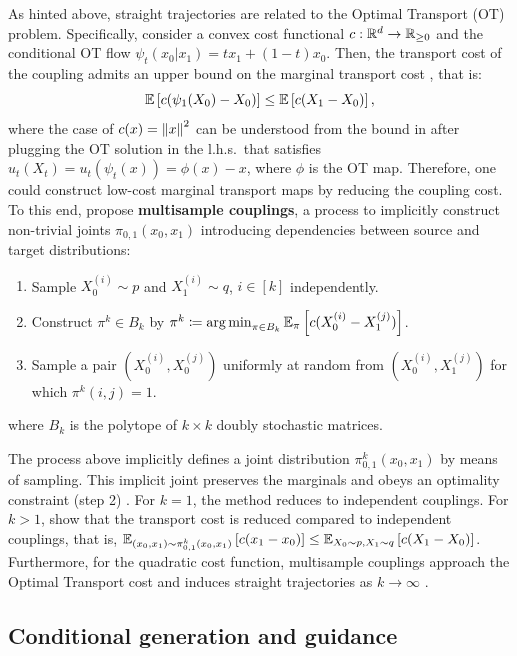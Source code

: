 \documentclass{fairmeta}
\newcommand{\highlight}[1]{{\color{metablue} \textbf{#1}}}
\renewcommand{\eqref}[1]{\labelcref{#1}}
\numberwithin{equation}{section}
\begin{document}
As hinted above, straight trajectories are related to the Optimal Transport (OT) problem.
Specifically, consider a convex cost functional $c:\mathbb R^d\rightarrow \mathbb R_{\geq0}$ and the conditional OT flow $\psi_t(x_0|x_1)=t x_1 + (1-t)x_0$.
Then, the transport cost of the coupling admits an upper bound on the marginal transport cost \citep{liu2022flow,pooladian2023multisample}, that is:
\begin{equation}
    \mathbb{E}\left [c(\psi_1(X_0)-X_0)\right ] \leq \mathbb{E} \left [c(X_1-X_0)\right ],
\end{equation}
where the case of $c(x)=\left\Vert x\right\Vert^2$ can be understood from the bound in \eqref{e:KE_leq_coupling} after plugging the OT solution in the l.h.s.~that satisfies $u_t(X_t)=u_t(\psi_t(x)) = \phi(x)-x$, where $\phi$ is the OT map.  
Therefore, one could construct low-cost marginal transport maps by reducing the coupling cost.
To this end, \citet{pooladian2023multisample} propose \highlight{multisample couplings}, a process to implicitly construct non-trivial joints $\pi_{0,1}(x_0, x_1)$ introducing dependencies between source and target distributions: 
\begin{enumerate}
    \item Sample  $X_0^{(i)}\sim p$ and $X_1^{(i)}\sim q$, $i\in [k]$ independently.
    \item Construct $\pi^k\in B_k$ by $\pi^k\coloneqq\operatorname*{arg\,min}_{\pi\in B_k} \mathbb{E}_{\pi}\left [c(X_0^{(i)}-X_1^{(j)})\right ]$.
    \item Sample a pair $(X_0^{(i)},X_0^{(j)})$ uniformly at random from $(X_0^{(i)},X_1^{(j)})$ for which $\pi^k(i,j)=1$.
\end{enumerate}
where $B_k$ is the polytope of $k\times k$ doubly stochastic matrices. 

The process above implicitly defines a joint distribution $\pi_{0,1}^k(x_0,x_1)$ by means of sampling.
This implicit joint preserves the marginals and obeys an optimality constraint (step 2) \citep{pooladian2023multisample}.
For $k=1$, the method reduces to independent couplings.
For $k>1$, \citet{pooladian2023multisample} show that the transport cost is reduced compared to independent couplings, that is, $\mathbb{E}_{(x_0,x_1)\sim\pi_{0,1}^k(x_0,x_1) } \left [c(x_1-x_0)\right ] \leq \mathbb{E}_{X_0\sim p, X_1\sim q} \left [c(X_1-X_0)\right ]$.
Furthermore, for the quadratic cost function, multisample couplings approach the Optimal Transport cost and induces straight trajectories as $k\to\infty$ \citep{pooladian2023multisample,tong2023improving}.


\subsection{Conditional generation and guidance}\label{sec:guided_generation}
\end{document}

